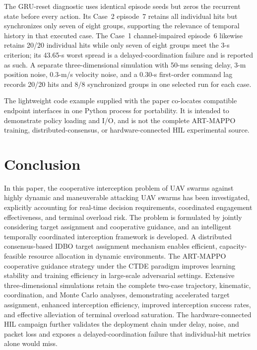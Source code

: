 \documentclass[lettersize,journal]{IEEEtran}
\begin{document}
The GRU-reset diagnostic uses identical episode seeds but zeros the recurrent
state before every action. Its Case~2 episode~7 retains all individual hits but
synchronizes only seven of eight groups, supporting the relevance of temporal
history in that executed case. The Case~1 channel-impaired episode~6 likewise
retains 20/20 individual hits while only seven of eight groups meet the 3-s
criterion; its 43.65-s worst spread is a delayed-coordination failure and is
reported as such. A separate three-dimensional simulation with 50-ms sensing
delay, 3-m position noise, 0.3-m/s velocity noise, and a 0.30-s first-order
command lag records 20/20 hits and 8/8 synchronized groups in one selected run
for each case.

The lightweight code example supplied with the paper co-locates compatible
endpoint interfaces in one Python process for portability. It is intended to
demonstrate policy loading and I/O, and is not the complete ART-MAPPO training,
distributed-consensus, or hardware-connected HIL experimental source.



\section{Conclusion}
\label{sec:conclusion}

In this paper, the cooperative interception problem of UAV swarms against highly dynamic and
maneuverable attacking UAV swarms has been investigated, explicitly accounting for real-time
decision requirements, coordinated engagement effectiveness, and terminal overload risk.
The problem is formulated by jointly considering target assignment and cooperative guidance,
and an intelligent temporally coordinated interception framework is developed.
A distributed consensus-based IDBO target assignment mechanism enables
efficient, capacity-feasible resource allocation in dynamic environments.
The ART-MAPPO cooperative guidance strategy under the CTDE paradigm improves learning
stability and training efficiency in large-scale adversarial settings.
Extensive three-dimensional simulations retain the complete two-case trajectory,
kinematic, coordination, and Monte Carlo analyses, demonstrating accelerated
target assignment, enhanced interception efficiency, improved interception
success rates, and effective alleviation of terminal overload saturation. The
hardware-connected HIL campaign further validates the deployment chain under
delay, noise, and packet loss and exposes a delayed-coordination failure that
individual-hit metrics alone would miss.
\end{document}
